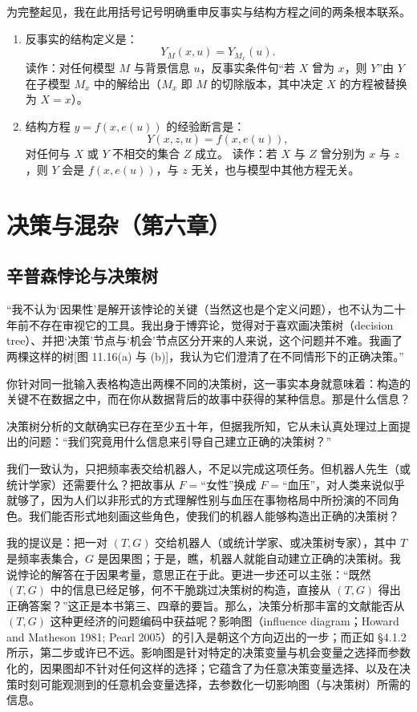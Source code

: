 为完整起见，我在此用括号记号明确重申反事实与结构方程之间的两条根本联系。

\begin{enumerate}[label=\arabic*.,leftmargin=1.8em]
\item 反事实的结构定义是：
\[
Y_M(x,u)=Y_{M_x}(u).
\]
读作：对任何模型 $M$ 与背景信息 $u$，反事实条件句“若 $X$ 曾为 $x$，则 $Y$”由 $Y$ 在子模型 $M_x$ 中的解给出（$M_x$ 即 $M$ 的切除版本，其中决定 $X$ 的方程被替换为 $X=x$）。
\item 结构方程 $y=f(x,e(u))$ 的经验断言是：
\[
Y(x,z,u)=f(x,e(u)),
\]
对任何与 $X$ 或 $Y$ 不相交的集合 $Z$ 成立。
读作：若 $X$ 与 $Z$ 曾分别为 $x$ 与 $z$，则 $Y$ 会是 $f(x,e(u))$，与 $z$ 无关，也与模型中其他方程无关。
\end{enumerate}

\section{决策与混杂（第六章）}

\subsection{辛普森悖论与决策树}


“我不认为‘因果性’是解开该悖论的关键（当然这也是个定义问题），也不认为二十年前不存在审视它的工具。我出身于博弈论，觉得对于喜欢画决策树（decision tree）、并把‘决策’节点与‘机会’节点区分开来的人来说，这个问题并不难。我画了两棵这样的树[图 11.16(a) 与 (b)]，我认为它们澄清了在不同情形下的正确决策。”


你针对同一批输入表格构造出两棵不同的决策树，这一事实本身就意味着：构造的关键不在数据之中，而在你从数据背后的故事中获得的某种信息。那是什么信息？

决策树分析的文献确实已存在至少五十年，但据我所知，它从未认真处理过上面提出的问题：“我们究竟用什么信息来引导自己建立正确的决策树？”

我们一致认为，只把频率表交给机器人，不足以完成这项任务。但机器人先生（或统计学家）还需要什么？把故事从 $F=$“女性”换成 $F=$“血压”，对人类来说似乎就够了，因为人们以非形式的方式理解性别与血压在事物格局中所扮演的不同角色。我们能否形式地刻画这些角色，使我们的机器人能够构造出正确的决策树？

我的提议是：把一对 $(T,G)$ 交给机器人（或统计学家、或决策树专家），其中 $T$ 是频率表集合，$G$ 是因果图；于是，瞧，机器人就能自动建立正确的决策树。我说悖论的解答在于因果考量，意思正在于此。更进一步还可以主张：“既然 $(T,G)$ 中的信息已经足够，何不干脆跳过决策树的构造，直接从 $(T,G)$ 得出正确答案？”这正是本书第三、四章的要旨。那么，决策分析那丰富的文献能否从 $(T,G)$ 这种更经济的问题编码中获益呢？影响图（influence diagram；Howard and Matheson 1981; Pearl 2005）的引入是朝这个方向迈出的一步；而正如 \S4.1.2 所示，第二步或许已不远。影响图是针对特定的决策变量与机会变量之选择而参数化的，因果图却不针对任何这样的选择；它蕴含了为任意决策变量选择、以及在决策时刻可能观测到的任意机会变量选择，去参数化一切影响图（与决策树）所需的信息。

